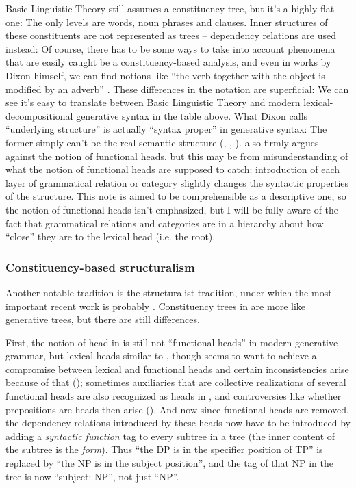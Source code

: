 \documentclass[UTF8, a4paper, oneside, scheme=plain]{ctexrep}
\newcommand*{\citepage}[1]{p.~{#1}}
\begin{document}
Basic Linguistic Theory still assumes a constituency tree,
but it's a highly flat one:
The only levels are words, noun phrases and clauses.
Inner structures of these constituents are not represented as trees -- 
dependency relations are used instead:
Of course, there has to be some ways 
to take into account phenomena that are easily caught be a constituency-based analysis,
and even in works by Dixon himself,
we can find notions like ``the verb together with the object is modified by an adverb''
\citep[\citepage{376}]{dixon2005semantic}.
These differences in the notation are superficial:
We can see it's easy to translate between Basic Linguistic Theory 
and modern lexical-decompositional generative syntax
in the table above.
What Dixon calls ``underlying structure'' is actually ``syntax proper'' in generative syntax:
The former simply can't be the real semantic structure 
(, ,
).
\citet{dixon2009basic1} also firmly argues against the notion of functional heads,
but this may be from misunderstanding of what the notion of functional heads are supposed to catch:
introduction of each layer of grammatical relation or category slightly changes 
the syntactic properties of the structure.
This note is aimed to be comprehensible as a descriptive one,
so the notion of functional heads isn't emphasized,
but I will be fully aware of the fact that 
grammatical relations and categories are in a hierarchy 
about how ``close'' they are to the lexical head (i.e. the root).

\subsubsection{Constituency-based structuralism}

Another notable tradition is the structuralist tradition,
under which the most important recent work is probably \citet{cgel}.
Constituency trees in \citet{cgel} are more like generative trees,
but there are still differences.

First, the notion of head in \citet{cgel} is still not ``functional heads'' 
in modern generative grammar, but lexical heads similar to \citet{dixon2009basic1},
though \citet[\citepage{357}]{cgel} seems to want to achieve a compromise between lexical and functional heads 
and certain inconsistencies arise because of that ();
sometimes auxiliaries that are collective realizations of several functional heads 
are also recognized as heads in \citet{cgel}, 
and controversies like whether prepositions are heads then arise
().
And now since functional heads are removed,
the dependency relations introduced by these heads
now have to be introduced by adding a \emph{syntactic function} tag 
to every subtree in a tree
(the inner content of the subtree is the \emph{form}).
Thus ``the DP is in the specifier position of TP''
is replaced by ``the NP is in the subject position'',
and the tag of that NP in the tree is now ``subject: NP'',
not just ``NP''.
\end{document}
